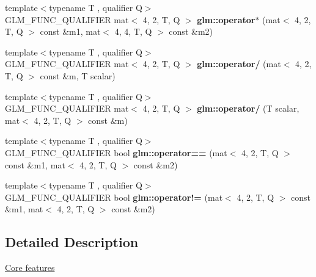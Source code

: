 \begin{DoxyCompactItemize}
\item 
\mbox{\label{type__mat4x2_8inl_ad8597c301e5b9d03f3933f7214b6cb6c}} 
{\footnotesize template$<$typename T , qualifier Q$>$ }\\G\+L\+M\+\_\+\+F\+U\+N\+C\+\_\+\+Q\+U\+A\+L\+I\+F\+I\+ER mat$<$ 4, 2, T, Q $>$ {\bfseries glm\+::operator$\ast$} (mat$<$ 4, 2, T, Q $>$ const \&m1, mat$<$ 4, 4, T, Q $>$ const \&m2)
\item 
\mbox{\label{type__mat4x2_8inl_afd5ae9f406ff05c83abfb22b00960449}} 
{\footnotesize template$<$typename T , qualifier Q$>$ }\\G\+L\+M\+\_\+\+F\+U\+N\+C\+\_\+\+Q\+U\+A\+L\+I\+F\+I\+ER mat$<$ 4, 2, T, Q $>$ {\bfseries glm\+::operator/} (mat$<$ 4, 2, T, Q $>$ const \&m, T scalar)
\item 
\mbox{\label{type__mat4x2_8inl_af087abf561e6d907bf0d54f995def024}} 
{\footnotesize template$<$typename T , qualifier Q$>$ }\\G\+L\+M\+\_\+\+F\+U\+N\+C\+\_\+\+Q\+U\+A\+L\+I\+F\+I\+ER mat$<$ 4, 2, T, Q $>$ {\bfseries glm\+::operator/} (T scalar, mat$<$ 4, 2, T, Q $>$ const \&m)
\item 
\mbox{\label{type__mat4x2_8inl_a218add00c8c3fd238c1589da83270f38}} 
{\footnotesize template$<$typename T , qualifier Q$>$ }\\G\+L\+M\+\_\+\+F\+U\+N\+C\+\_\+\+Q\+U\+A\+L\+I\+F\+I\+ER bool {\bfseries glm\+::operator==} (mat$<$ 4, 2, T, Q $>$ const \&m1, mat$<$ 4, 2, T, Q $>$ const \&m2)
\item 
\mbox{\label{type__mat4x2_8inl_a3dda08fd1c305fc742d0ba9baf5cf9a3}} 
{\footnotesize template$<$typename T , qualifier Q$>$ }\\G\+L\+M\+\_\+\+F\+U\+N\+C\+\_\+\+Q\+U\+A\+L\+I\+F\+I\+ER bool {\bfseries glm\+::operator!=} (mat$<$ 4, 2, T, Q $>$ const \&m1, mat$<$ 4, 2, T, Q $>$ const \&m2)
\end{DoxyCompactItemize}


\subsection{Detailed Description}
\hyperlink{group__core}{Core features} 